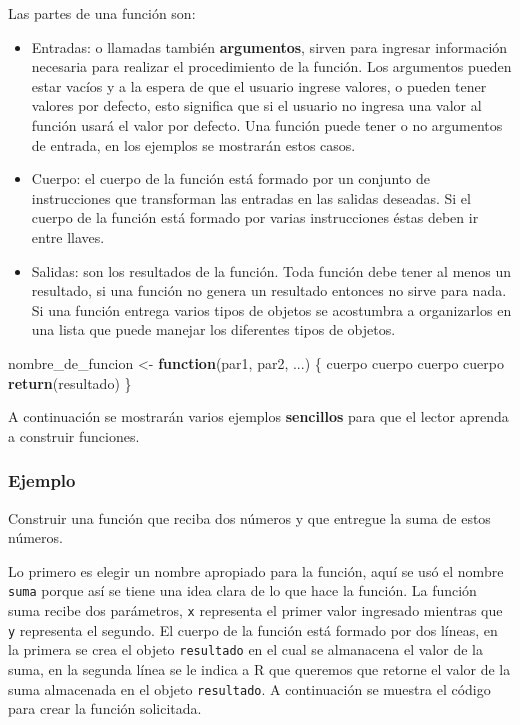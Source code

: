 \documentclass[10pt,]{krantz}
\makeatletter
\newenvironment{Shaded}{\begin{snugshade}}{\end{snugshade}}
\newcommand{\KeywordTok}[1]{\textcolor[rgb]{0.13,0.29,0.53}{\textbf{#1}}}
\newcommand{\StringTok}[1]{\textcolor[rgb]{0.31,0.60,0.02}{#1}}
\newcommand{\ControlFlowTok}[1]{\textcolor[rgb]{0.13,0.29,0.53}{\textbf{#1}}}
\newcommand{\NormalTok}[1]{#1}
\providecommand{\tightlist}{%
  \setlength{\itemsep}{0pt}\setlength{\parskip}{0pt}}
\newenvironment{kframe}{%
\medskip{}
\setlength{\fboxsep}{.8em}
 \def\at@end@of@kframe{}%
 \ifinner\ifhmode%
  \def\at@end@of@kframe{\end{minipage}}%
  \begin{minipage}{\columnwidth}%
 \fi\fi%
 \def\FrameCommand##1{\hskip\@totalleftmargin \hskip-\fboxsep
 \colorbox{shadecolor}{##1}\hskip-\fboxsep
     \hskip-\linewidth \hskip-\@totalleftmargin \hskip\columnwidth}%
 \MakeFramed {\advance\hsize-\width
   \@totalleftmargin\z@ \linewidth\hsize
   \@setminipage}}%
 {\par\unskip\endMakeFramed%
 \at@end@of@kframe}
\renewenvironment{Shaded}{\begin{kframe}}{\end{kframe}}
\makeatother
\begin{document}
Las partes de una función son:

\begin{itemize}
\tightlist
\item
  Entradas: o llamadas también \textbf{argumentos}, sirven para ingresar
  información necesaria para realizar el procedimiento de la función.
  Los argumentos pueden estar vacíos y a la espera de que el usuario
  ingrese valores, o pueden tener valores por defecto, esto significa
  que si el usuario no ingresa una valor al función usará el valor por
  defecto. Una función puede tener o no argumentos de entrada, en los
  ejemplos se mostrarán estos casos.
\item
  Cuerpo: el cuerpo de la función está formado por un conjunto de
  instrucciones que transforman las entradas en las salidas deseadas. Si
  el cuerpo de la función está formado por varias instrucciones éstas
  deben ir entre llaves.
\item
  Salidas: son los resultados de la función. Toda función debe tener al
  menos un resultado, si una función no genera un resultado entonces no
  sirve para nada. Si una función entrega varios tipos de objetos se
  acostumbra a organizarlos en una lista que puede manejar los
  diferentes tipos de objetos.
\end{itemize}

\begin{Shaded}
\begin{Highlighting}[]
\NormalTok{nombre_de_funcion <-}\StringTok{ }\ControlFlowTok{function}\NormalTok{(par1, par2, ...) \{}
\NormalTok{  cuerpo}
\NormalTok{  cuerpo}
\NormalTok{  cuerpo}
\NormalTok{  cuerpo}
  \KeywordTok{return}\NormalTok{(resultado)}
\NormalTok{\}}
\end{Highlighting}
\end{Shaded}

A continuación se mostrarán varios ejemplos \textbf{sencillos} para que
el lector aprenda a construir funciones.

\subsubsection*{Ejemplo}\label{ejemplo-5}

Construir una función que reciba dos números y que entregue la suma de
estos números.

Lo primero es elegir un nombre apropiado para la función, aquí se usó el
nombre \texttt{suma} porque así se tiene una idea clara de lo que hace
la función. La función suma recibe dos parámetros, \texttt{x} representa
el primer valor ingresado mientras que \texttt{y} representa el segundo.
El cuerpo de la función está formado por dos líneas, en la primera se
crea el objeto \texttt{resultado} en el cual se almanacena el valor de
la suma, en la segunda línea se le indica a R que queremos que retorne
el valor de la suma almacenada en el objeto \texttt{resultado}. A
continuación se muestra el código para crear la función solicitada.
\end{document}
